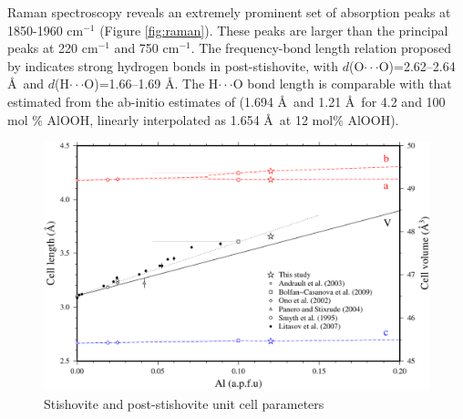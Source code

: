\documentclass[review]{elsarticle}
\begin{document}
Raman spectroscopy reveals an extremely prominent set of absorption peaks at 1850-1960 cm$^{-1}$ (Figure \ref{fig:raman}). These peaks are larger than the principal peaks at 220 cm$^{-1}$ and 750 cm$^{-1}$. The frequency-bond length relation proposed by \cite{Libowitzky1999} indicates strong hydrogen bonds in post-stishovite, with $d$(O$\cdot\cdot\cdot$O)=2.62--2.64 \AA\ and $d$(H$\cdot\cdot\cdot$O)=1.66--1.69 \AA. The H$\cdot\cdot\cdot$O bond length is comparable with that estimated from the ab-initio estimates of \cite{PS2004} (1.694 \AA\ and 1.21 \AA\ for 4.2 and 100 mol \% AlOOH, linearly interpolated as  1.654 \AA\ at 12 mol\% AlOOH).

\begin{figure}[ht!]
  \centering
  \includegraphics[width=1.0\textwidth]{figures/ambient_stv_cell_parameters.pdf}
  \caption{Stishovite and post-stishovite unit cell parameters}
  \label{fig:volumes}
\end{figure}
\end{document}
